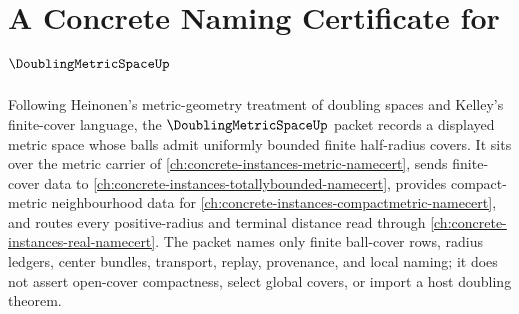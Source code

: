 \chapter{A Concrete Naming Certificate for $\DoublingMetricSpaceUp$}
\label{ch:concrete-instances-doubling-metric-space-namecert}

Following Heinonen's metric-geometry treatment of doubling spaces and Kelley's finite-cover language, the $\DoublingMetricSpaceUp$ packet records a displayed metric space whose balls admit uniformly bounded finite half-radius covers. It sits over the metric carrier of \autoref{ch:concrete-instances-metric-namecert}, sends finite-cover data to \autoref{ch:concrete-instances-totallybounded-namecert}, provides compact-metric neighbourhood data for \autoref{ch:concrete-instances-compactmetric-namecert}, and routes every positive-radius and terminal distance read through \autoref{ch:concrete-instances-real-namecert}. The packet names only finite ball-cover rows, radius ledgers, center bundles, transport, replay, provenance, and local naming; it does not assert open-cover compactness, select global covers, or import a host doubling theorem.

